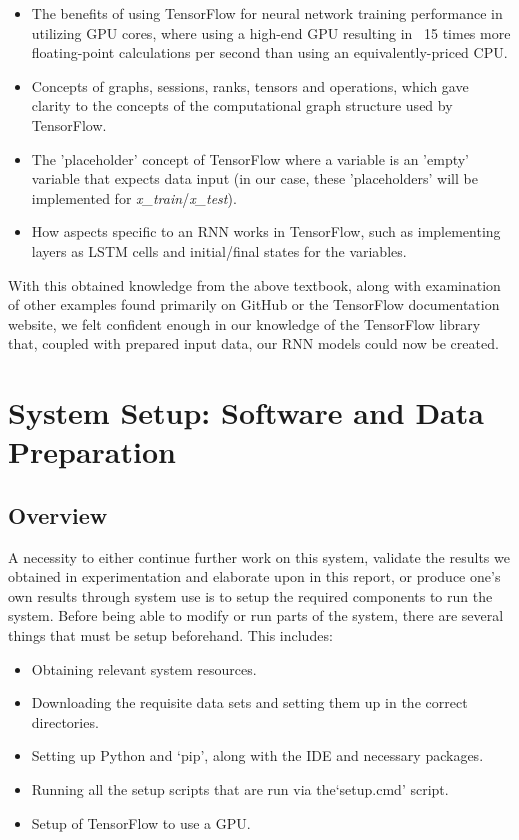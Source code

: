 \documentclass[12pt,twoside]{report}
\begin{document}
\begin{itemize}
	\item The benefits of using TensorFlow for neural network training performance in utilizing GPU cores, where using a high-end GPU resulting in ~15 times more floating-point calculations per second than using an equivalently-priced CPU.
	\item Concepts of graphs, sessions, ranks, tensors and operations, which gave clarity to the concepts of the computational graph structure used by TensorFlow.
	\item The 'placeholder' concept of  TensorFlow where a variable is an 'empty' variable that expects data input (in our case, these 'placeholders' will be implemented for \textit{x\_train}/\textit{x\_test}).
	\item How aspects specific to an RNN works in TensorFlow, such as implementing layers as LSTM cells and initial/final states for the variables.
\end{itemize}

\quad With this obtained knowledge from the above textbook, along with examination of other examples found primarily on GitHub or the TensorFlow documentation website, we felt confident enough in our knowledge of the TensorFlow library that, coupled with prepared input data, our RNN models could now be created.




\chapter{System Setup: Software and Data Preparation\\}

\section{Overview}

\quad A necessity to either continue further work on this system, validate the results we obtained in experimentation and elaborate upon in this report, or produce one’s own results through system use is to setup the required components to run the system. Before being able to modify or run parts of the system, there are several things that must be setup beforehand. This includes:

\begin{itemize}
	\item Obtaining relevant system resources.
	\item Downloading the requisite data sets and setting them up in the correct directories.
	\item Setting up Python and ‘pip’, along with the IDE and necessary packages.
	\item Running all the setup scripts that are run via the‘setup.cmd’ script.
	\item Setup of TensorFlow to use a GPU.
\end{itemize}
\end{document}
